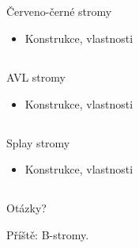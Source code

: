 \documentclass{beamer}
\begin{document}
\subsection{}
\begin{frame}{Červeno-černé stromy}
\begin{itemize}
\item Konstrukce, vlastnosti
\end{itemize}
\end{frame}

\subsection{}
\begin{frame}{AVL stromy}
\begin{itemize}
\item Konstrukce, vlastnosti
\end{itemize}
\end{frame}

\subsection{}
\begin{frame}{Splay stromy}
\begin{itemize}
\item Konstrukce, vlastnosti
\end{itemize}
\end{frame}

\subsection{}
\begin{frame}{Otázky?}
\begin{center}
Příště: B-stromy.
\end{center}
\end{frame}

\subsection{}
\end{document}
